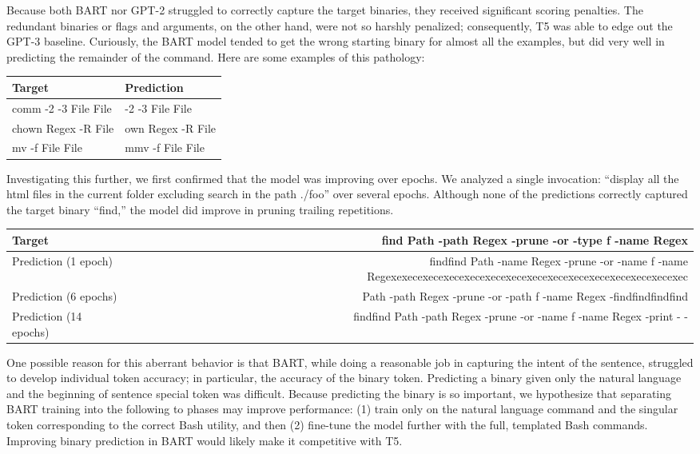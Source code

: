 Because both BART nor GPT-2 struggled to correctly capture the target binaries,
they received significant scoring penalties. The redundant binaries or flags
and arguments, on the other hand, were not so harshly penalized; consequently,
T5 was able to edge out the GPT-3 baseline. Curiously, the BART model tended to
get the wrong starting binary for almost all the examples, but did very well in predicting the remainder of the command. Here are some examples of this pathology:
\begin{center}
	\begin{tabular}{ |O|O| }
		\hline
		\textbf{Target}      & \textbf{Prediction} \\
		\hline
		comm -2 -3 File File &
		-2 -3 File File                            \\
		\hline
		chown Regex -R File  &
		own Regex -R File                          \\
		\hline
		mv -f File File      & mmv -f File File    \\
		\hline
	\end{tabular}
\end{center}
Investigating this further, we first confirmed that the model was improving over epochs.
We analyzed a single invocation: ``display all the html files in the current
folder excluding search in the path ./foo'' over several epochs. Although none
of the predictions correctly captured the target binary ``find,'' the model did
improve in pruning trailing repetitions.
\begin{center}
	\begin{tabular}{|M|N|}
		\hline
		Target                 & find Path -path Regex -prune -or -type f -name Regex                                                             \\
		\hline
		Prediction (1 epoch)   & findfind Path -name Regex -prune -or -name f -name Regexexecexecexecexecexecexecexecexecexecexecexecexecexecexec \\
		\hline
		Prediction (6 epochs)  & Path -path Regex -prune -or -path f -name Regex -findfindfindfind                                                \\
		\hline
		Prediction (14 epochs) & findfind Path -path Regex -prune -or -name f -name Regex -print - -                                              \\
		\hline
	\end{tabular}
\end{center}
One possible reason for this aberrant behavior is that BART, while doing a reasonable job in capturing the intent of the sentence, struggled to develop individual token accuracy; in particular, the accuracy of the binary token. Predicting a binary given only the natural language and the beginning of sentence special token was difficult. Because predicting the binary is so important, we hypothesize that separating BART training into the following to phases may improve performance: (1) train only on the natural language command and the singular token corresponding to the correct Bash utility, and then (2) fine-tune the model further with the full, templated Bash commands. Improving binary prediction in BART would likely make it competitive with T5.
